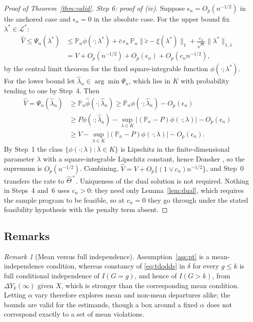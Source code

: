 \documentclass[12pt]{article}
\theoremstyle{remark}
\newtheorem{remark}{Remark}
\begin{document}
\begin{proof}[Proof of Theorem~\ref{thm:valid}]
\emph{Step 6: proof of (iv).} Suppose $\epsilon_n = O_p(n^{-1/2})$ in the anchored case
and $\epsilon_n = 0$ in the absolute case. For the upper bound fix $\lambda^* \in \mathcal{L}^*$:
\begin{align*}
\widehat V \le \Psi_n(\lambda^*)
&\le \mathbb{P}_n\phi(\cdot;\lambda^*) + \bar c\,\epsilon_n\,\mathbb{P}_n\|\tilde c - \xi(\lambda^*)\|_1
 + \frac{c_n}{\sqrt n}\|\lambda^*\|_{1,\widehat s}\\
&= V + O_p(n^{-1/2}) + O_p(\epsilon_n) + O_p(c_n n^{-1/2}),
\end{align*}
by the central limit theorem for the fixed square-integrable function $\phi(\cdot;\lambda^*)$.
For the lower bound let $\widehat\lambda_n \in \arg\min\Psi_n$, which lies in $K$ with
probability tending to one by Step~4. Then
\begin{align*}
\widehat V = \Psi_n(\widehat\lambda_n)
&\ge \mathbb{P}_n\widehat\phi(\cdot;\widehat\lambda_n)
\ge \mathbb{P}_n\phi(\cdot;\widehat\lambda_n) - O_p(\epsilon_n)\\
&\ge P\phi(\cdot;\widehat\lambda_n) - \sup_{\lambda \in K}|(\mathbb{P}_n - P)\phi(\cdot;\lambda)| - O_p(\epsilon_n)\\
&\ge V - \sup_{\lambda \in K}|(\mathbb{P}_n - P)\phi(\cdot;\lambda)| - O_p(\epsilon_n).
\end{align*}
By Step~1 the class $\{\phi(\cdot;\lambda) : \lambda \in K\}$ is Lipschitz in the
finite-dimensional parameter $\lambda$ with a square-integrable Lipschitz constant, hence
Donsker \citep[Example~19.7]{vandervaart1998asymptotic}, so the supremum is
$O_p(n^{-1/2})$. Combining, $\widehat V = V + O_p\{(1 \vee c_n) n^{-1/2}\}$, and Step~0
transfers the rate to $\widehat\Theta^{+}$. Uniqueness of the dual solution is not
required. Nothing in Steps~4 and~6 uses $c_n > 0$: they need only Lemma~\ref{lem:dual},
which requires the sample program to be feasible, so at $c_n = 0$ they go through under
the stated feasibility hypothesis with the penalty term absent.
\end{proof}

\subsection{Remarks}
\label{app:remarks}

\begin{remark}[Mean versus full independence]
\label{rmk:meanind}
Assumption~\ref{ass:pt} is a mean-independence condition, whereas constancy of
\eqref{eq:tdodds} in $\delta$ for every $g \le k$ is full conditional independence of
$I(G{=}g)$, and hence of $I(G{>}k)$, from $\Delta Y_k(\infty)$ given $X$, which is
stronger than the corresponding mean condition. Letting $\alpha$ vary therefore explores
mean and non-mean departures alike; the bounds are valid for the estimands, though a box
around a fixed $\alpha$ does not correspond exactly to a set of mean violations.
\end{remark}
\end{document}
